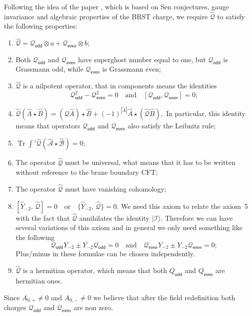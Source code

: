 \documentclass[a4paper,12pt]{article}
\newcommand{\Ac}{\mathcal{A}}
\newcommand{\Bc}{\mathcal{B}}
\newcommand{\Ic}{\mathcal{I}}
\newcommand{\Qc}{\mathcal{Q}}
\newcommand{\Tr}{\mathop{\mathrm{Tr}}\nolimits}
\begin{document}
Following the idea of the paper \cite{F2},
which is based on Sen conjectures, gauge invariance
and algebraic properties of the BRST charge,
we require $\hat{\Qc}$ to satisfy the following properties:
\begin{enumerate}
\item $\hat{\Qc}=\Qc_{\textsf{odd}}\otimes a + \Qc_{\textsf{even}}\otimes b$;
\item Both $\Qc_{\textsf{odd}}$ and $\Qc_{\textsf{even}}$ have superghost number
equal to one, but $\Qc_{\textsf{odd}}$ is Grassmann odd, while
$\Qc_{\textsf{even}}$ is Grassmann even;
\item $\hat{\Qc}$ is a nilpotent operator, that in components means
the identities
$$
\Qc_{\textsf{odd}}^2-\Qc_{\textsf{even}}^2=0
\quad\text{and}\quad
[\Qc_{\textsf{odd}},\Qc_{\textsf{even}}]=0;
\label{Qequations}
$$
\item
$
\hat{\Qc}(\hat{A}\star\hat{B})=(\hat{\Qc}\hat{A})\star\hat{B}+(-1)^{|\hat{A}|}
\hat{A}\star(\hat{\Qc}\hat{B}),
$
In particular, this identity means that operators $\Qc_{\textsf{odd}}$ and $\Qc_{\textsf{even}}$
also satisfy the Leibnitz rule;
\item
$
\Tr \int'\hat{\Qc}(\hat{\Ac}\star\hat{\Bc})=0;
$
\item The operator $\hat{\Qc}$ must be universal, what means
that it has to be written without reference to the brane
boundary CFT;
\item The operator $\hat{\Qc}$ must have vanishing cohomology;
\item
$
[\hat{Y}_{-2},\,\hat{\Qc}]=0\quad\text{or}\quad
\{\hat{Y}_{-2},\,\hat{\Qc}\}=0.
$
We need this axiom to relate the axiom~5 with the fact
that $\hat{\Qc}$ annihilates the identity $|\Ic\rangle$. Therefore
we can have several variations of this axiom and in general
we only need something like the following
\begin{equation*}
\Qc_{\textsf{odd}}Y_{-2}\pm Y_{-2}\Qc_{\textsf{odd}}=0\quad\text{and}\quad
\Qc_{\textsf{even}}Y_{-2}\pm Y_{-2}\Qc_{\textsf{even}}=0;
\end{equation*}
Plus/minus in these formulae can be chosen independently.
\item $\hat{\Qc}$ is a hermitian operator, which means that both
$Q_{\textsf{odd}}$ and $Q_{\textsf{even}}$ are hermitian ones.
\end{enumerate}

Since $A_{0,+}\neq 0$ and $A_{0,-}\neq 0$ we believe that after the field
redefinition both charges $\Qc_{\textsf{odd}}$ and
$\Qc_{\textsf{even}}$ are non zero.
\end{document}
